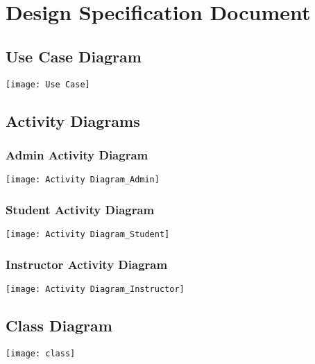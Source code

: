 \documentclass[12pt]{article}
\begin{document}
\section{Design Specification Document}
	\subsection{Use Case Diagram}
		\begin{center}
			\texttt{[image: Use Case]}\\[0.5in]
		\end{center}
		\subsection{Activity Diagrams}
			\subsubsection{Admin Activity Diagram}
				\vspace{4cm}
				\begin{center}
					\texttt{[image: Activity Diagram\_Admin]}\\[0.5in]
				\end{center}
	
			\subsubsection{Student Activity Diagram}
			\vspace{4cm}
			\begin{center}
				\texttt{[image: Activity Diagram\_Student]}\\[0.5in]
			\end{center}
			\subsubsection{Instructor Activity Diagram}
			\vspace{4cm}
			\begin{center}
				\texttt{[image: Activity Diagram\_Instructor]}\\[0.5in]
			\end{center}
			

	\subsection{Class Diagram}
	\vspace{4cm}
	\begin{center}
		\texttt{[image: class]}\\[0.5in]
	\end{center}
\end{document}
